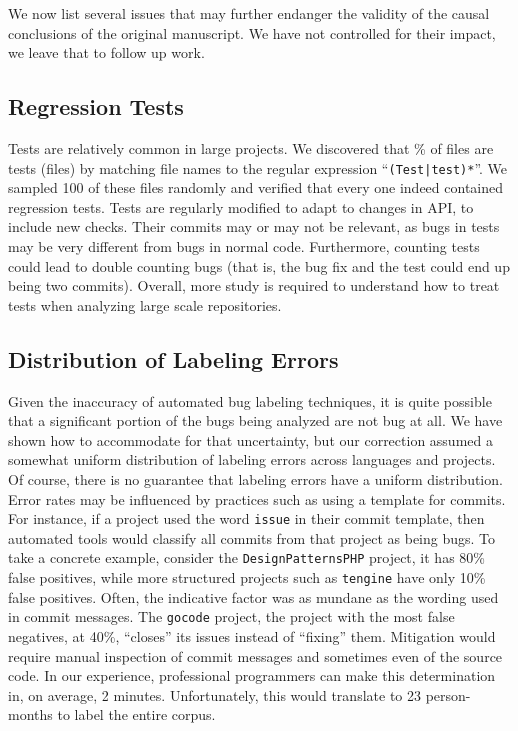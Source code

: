 \documentclass[acmsmall]{acmart}
\newcommand{\pct}[1]{#1\!\!\%\xspace}
\newcommand{\code}[1]{{\tt\small #1}\xspace}
\begin{document}
We now list several issues that may further endanger
the validity of the causal conclusions of the original manuscript. We 
have not controlled for their impact, we leave that to follow up work.

\subsection{Regression Tests}
Tests are relatively common in large projects. 
We discovered that
\pct{\ratioTestsFiles} of files are tests (\testFilesCommitted files) by 
matching file
names to the regular expression ``\code{*(Test|test)*}''. We sampled 100 of
these files randomly and verified that every one indeed contained 
regression tests. Tests are regularly modified to adapt to changes in API,
to include new checks. Their commits may or may not be relevant, as
bugs in tests may be very different from bugs in normal code. Furthermore,
counting tests could lead to double counting bugs (that is, the bug fix and
the test could end up being two commits). Overall, more study is required to
understand how to treat tests when analyzing large scale repositories.

\subsection{Distribution of Labeling Errors}

Given the inaccuracy of automated bug labeling techniques, it is quite
possible that a significant portion of the bugs being analyzed are not
bug at all. We have shown how to accommodate for that uncertainty, but
our correction assumed a somewhat uniform distribution of labeling
errors across languages and projects.
Of course, there is no guarantee that labeling errors have a uniform
distribution.  Error rates may be influenced by practices such as using a
template for commits. For instance, if a project used the word \code{issue}
in their commit template, then automated tools would classify all commits
from that project as being bugs. To take a concrete example, consider the
\code{Design\-Patterns\-PHP} project, it has 80\% false positives, while
more structured projects such as \code{tengine} have only 10\% false
positives. Often, the indicative factor was as mundane as the wording used
in commit messages. The \code{gocode} project, the project with the most
false negatives, at 40\%, ``closes'' its issues instead of ``fixing'' them.
Mitigation would require manual inspection of commit messages and sometimes
even of the source code. In our experience, professional programmers can
make this determination in, on average, 2 minutes.  Unfortunately, this
would translate to 23 person-months to label the entire corpus.
\end{document}
